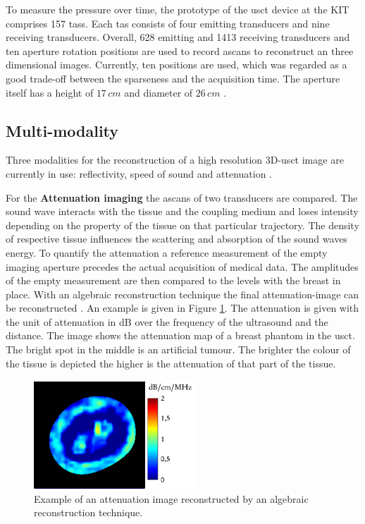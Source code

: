 To measure the pressure over time, the prototype of the \ac{usct} device at the KIT comprises 157 \acp{tas}. Each \ac{tas} consists of four emitting transducers and nine receiving transducers. Overall, 628 emitting and 1413 receiving transducers and ten aperture rotation positions are used to record \acp{ascan} to reconstruct an three dimensional images. Currently, ten positions are used, which was regarded as a good trade-off between the sparseness and the acquisition time. The aperture itself has a height of $17\,cm$ and diameter of $26\,cm$ \cite{Kretzek2014GPUAberration}.







\subsection{Multi-modality}
\label{sec:multimodality}

Three modalities for the reconstruction of a high resolution 3D-\ac{usct} image are currently in use: reflectivity, speed of sound and attenuation \cite{Jirik2012Sound-speedTomography}.

For the \textbf{Attenuation imaging} the \acp{ascan} of two transducers are compared. The sound wave interacts with the tissue and the coupling medium and loses intensity depending on the property of the tissue on that particular trajectory. The density of respective tissue influences the scattering and absorption of the sound waves energy. To quantify the attenuation a reference measurement of the empty imaging aperture precedes the actual acquisition of medical data. The amplitudes of the empty measurement are then compared to the levels with the breast in place. With an algebraic reconstruction technique the final attenuation-image can be reconstructed \cite{Dapp2011Geometry-independentInformation}. An example is given in Figure \ref{att_image_example}. The attenuation is given with the unit of attenuation in dB over the frequency of the ultrasound and the distance. The image shows the attenuation map of a breast phantom in the \ac{usct}. The bright spot in the middle is an artificial tumour. The brighter the colour of the tissue is depicted the higher is the attenuation of that part of the tissue.


\begin{figure}[H]
    \centering
    \includegraphics[width=0.55\textwidth]{Graphics/att_example.png}
    \caption{ Example of an attenuation image reconstructed by an algebraic reconstruction technique. }
    \label{att_image_example}
\end{figure}



